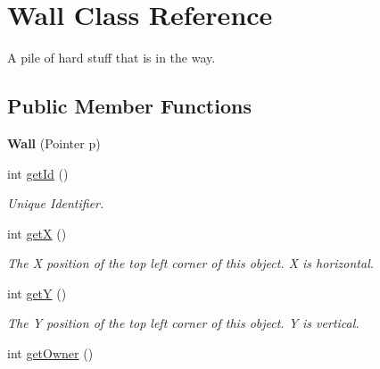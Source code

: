 \hypertarget{classWall}{
\section{Wall Class Reference}
\label{classWall}
}


A pile of hard stuff that is in the way.  


\subsection*{Public Member Functions}
\begin{DoxyCompactItemize}
\item 
\hypertarget{classWall_a6658d5385bc5b0911ea9c2b09cfeb575}{
{\bfseries Wall} (Pointer p)}
\label{classWall_a6658d5385bc5b0911ea9c2b09cfeb575}

\item 
\hypertarget{classWall_ae96580b384fd52812d0aeff1ac310c36}{
int \hyperlink{classWall_ae96580b384fd52812d0aeff1ac310c36}{getId} ()}
\label{classWall_ae96580b384fd52812d0aeff1ac310c36}

\begin{DoxyCompactList}\small\item\em Unique Identifier. \item\end{DoxyCompactList}\item 
\hypertarget{classWall_a82de03ec66583e6ac4deaf808960dc7f}{
int \hyperlink{classWall_a82de03ec66583e6ac4deaf808960dc7f}{getX} ()}
\label{classWall_a82de03ec66583e6ac4deaf808960dc7f}

\begin{DoxyCompactList}\small\item\em The X position of the top left corner of this object. X is horizontal. \item\end{DoxyCompactList}\item 
\hypertarget{classWall_ac0c5e97903d00561af2aa2dabb2c4c49}{
int \hyperlink{classWall_ac0c5e97903d00561af2aa2dabb2c4c49}{getY} ()}
\label{classWall_ac0c5e97903d00561af2aa2dabb2c4c49}

\begin{DoxyCompactList}\small\item\em The Y position of the top left corner of this object. Y is vertical. \item\end{DoxyCompactList}\item 
\hypertarget{classWall_a8fb3c90bc8076a7ca421c9018cbbb7dc}{
int \hyperlink{classWall_a8fb3c90bc8076a7ca421c9018cbbb7dc}{getOwner} ()}
\label{classWall_a8fb3c90bc8076a7ca421c9018cbbb7dc}


\end{DoxyCompactItemize}
